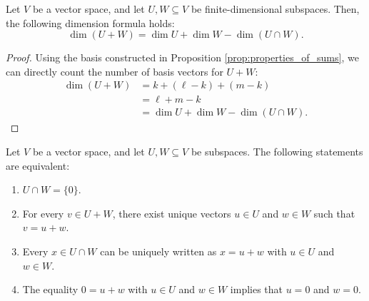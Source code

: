 \begin{theorem}
\label{thm:dimension_formula_sums}
Let $V$ be a vector space, and let $U, W \subseteq V$ be finite-dimensional subspaces. Then, the following dimension formula holds:
\[
\dim(U + W) = \dim U + \dim W - \dim(U \cap W).
\]
\end{theorem}

\begin{proof}
Using the basis constructed in Proposition \cref{prop:properties_of_sums}, we can directly count the number of basis vectors for $U + W$:
\begin{align*}
\dim(U + W) &= k + (\ell - k) + (m - k) \\
&= \ell + m - k \\
&= \dim U + \dim W - \dim(U \cap W).
\end{align*}
\end{proof}

\begin{corollary}
\label{cor:trivial_intersection}
Let $V$ be a vector space, and let $U, W \subseteq V$ be subspaces. The following statements are equivalent:
\begin{enumerate}
    \item $U \cap W = \{0\}$.
    \item For every $v \in U + W$, there exist unique vectors $u \in U$ and $w \in W$ such that $v = u + w$.
    \item Every $x \in U \cap W$ can be uniquely written as $x = u + w$ with $u \in U$ and $w \in W$.
    \item The equality $0 = u + w$ with $u \in U$ and $w \in W$ implies that $u = 0$ and $w = 0$.
\end{enumerate}
\end{corollary}

